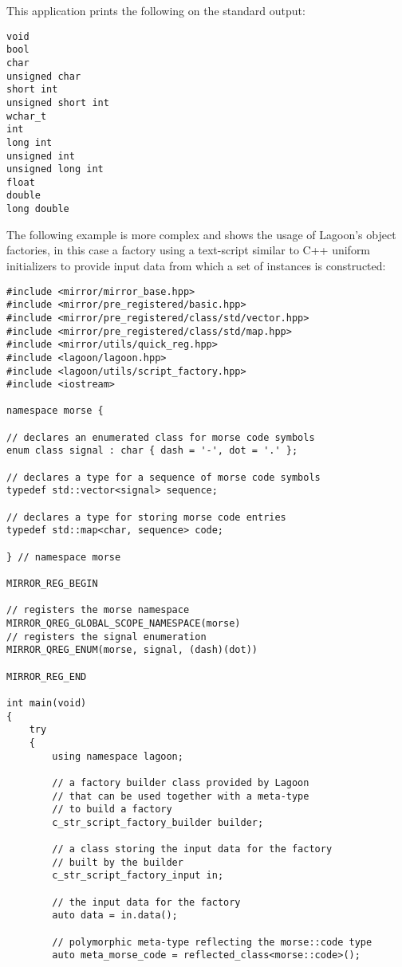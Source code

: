 This application prints the following on the standard output:

\begin{verbatim}
void
bool
char
unsigned char
short int
unsigned short int
wchar_t
int
long int
unsigned int
unsigned long int
float
double
long double
\end{verbatim}

The following example is more complex and shows the usage of Lagoon's
object factories, in this case a factory using a text-script similar
to C++ uniform initializers to provide input data from which a set
of instances is constructed:

\begin{verbatim}
#include <mirror/mirror_base.hpp>
#include <mirror/pre_registered/basic.hpp>
#include <mirror/pre_registered/class/std/vector.hpp>
#include <mirror/pre_registered/class/std/map.hpp>
#include <mirror/utils/quick_reg.hpp>
#include <lagoon/lagoon.hpp>
#include <lagoon/utils/script_factory.hpp>
#include <iostream>

namespace morse {

// declares an enumerated class for morse code symbols
enum class signal : char { dash = '-', dot = '.' };

// declares a type for a sequence of morse code symbols
typedef std::vector<signal> sequence;

// declares a type for storing morse code entries
typedef std::map<char, sequence> code;

} // namespace morse

MIRROR_REG_BEGIN

// registers the morse namespace
MIRROR_QREG_GLOBAL_SCOPE_NAMESPACE(morse)
// registers the signal enumeration
MIRROR_QREG_ENUM(morse, signal, (dash)(dot))

MIRROR_REG_END

int main(void)
{
    try
    {
        using namespace lagoon;

        // a factory builder class provided by Lagoon
        // that can be used together with a meta-type
        // to build a factory
        c_str_script_factory_builder builder;

        // a class storing the input data for the factory
        // built by the builder
        c_str_script_factory_input in;

        // the input data for the factory
        auto data = in.data();

        // polymorphic meta-type reflecting the morse::code type
        auto meta_morse_code = reflected_class<morse::code>();


\end{verbatim}
